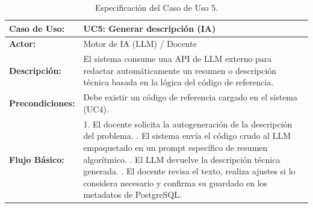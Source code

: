 \begin{table}[H]
	\centering
	\begin{tabular}{|p{3cm}|p{11cm}|}
		\hline
		\rowcolor[HTML]{E7F3FF}
		\textbf{Caso de Uso:}    & \textbf{UC5: Generar descripción (IA)}                                                                                                                 \\ \hline
		\textbf{Actor:}          & Motor de IA (LLM) / Docente                                                                                                                            \\ \hline
		\textbf{Descripción:}    & El sistema consume una API de LLM externo para redactar automáticamente un resumen o descripción técnica basada en la lógica del código de referencia. \\ \hline
		\textbf{Precondiciones:} & Debe existir un código de referencia cargado en el sistema (UC4).                                                                                      \\ \hline
		\textbf{Flujo Básico:}   &
		1. El docente solicita la autogeneración de la descripción del problema. \newline
		2. El sistema envía el código crudo al LLM empaquetado en un prompt específico de resumen algorítmico. \newline
		3. El LLM devuelve la descripción técnica generada. \newline
		4. El docente revisa el texto, realiza ajustes si lo considera necesario y confirma su guardado en los metadatos de PostgreSQL.                                                   \\ \hline
	\end{tabular}
	\caption{Especificación del Caso de Uso 5.}
\end{table}

